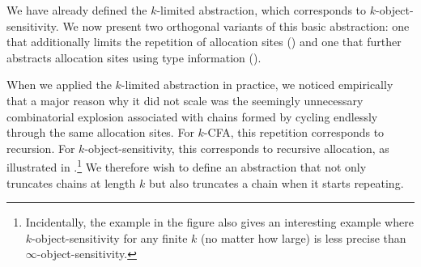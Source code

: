 

We have already defined the $k$-limited abstraction, which corresponds to
$k$-object-sensitivity.  We now present two orthogonal variants of this basic abstraction: one that
additionally limits the repetition of allocation sites ()
and one that further abstracts allocation sites using type information
().


When we applied the $k$-limited abstraction in practice,
we noticed empirically that a major reason why it did not scale was
the seemingly unnecessary combinatorial explosion associated with chains formed
by cycling endlessly through the same allocation sites.
For $k$-CFA, this repetition corresponds to recursion.
For $k$-object-sensitivity, this corresponds to recursive allocation, as
illustrated in .\footnote{
Incidentally, the example in the figure also gives an interesting example where
$k$-object-sensitivity for any finite $k$ (no matter how large) is less precise
than $\infty$-object-sensitivity.}
We therefore wish to define an abstraction that not only truncates chains at length $k$ but also truncates
a chain when it starts repeating.

